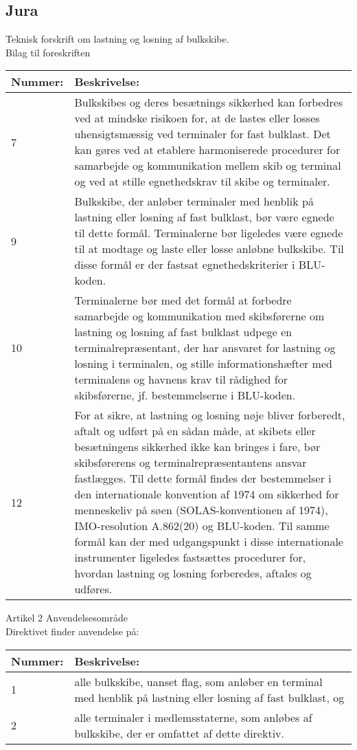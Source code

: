 \subsection{Jura}
Teknisk forskrift om lastning og losning af bulkskibe.\\
Bilag til foreskriften
\begin{table}[H]
\begin{tabular}{|p{1.5cm}|p{12cm}|} \hline
\cellcolor[gray]{0.85}Nummer: & \cellcolor[gray]{0.85}Beskrivelse:  \\ \hline
7 & Bulkskibes og deres besætnings sikkerhed kan forbedres ved at mindske risikoen for, at de lastes eller losses uhensigtsmæssig ved terminaler for fast bulklast. Det kan gøres ved at etablere harmoniserede procedurer for samarbejde og kommunikation mellem skib og terminal og ved at stille egnethedskrav til skibe og terminaler.   \\ \hline
9 & Bulkskibe, der anløber terminaler med henblik på lastning eller losning af fast bulklast, bør være egnede til dette formål. Terminalerne bør ligeledes være egnede til at modtage og laste eller losse anløbne bulkskibe. Til disse formål er der fastsat egnethedskriterier i BLU-koden. \\ \hline
10 & Terminalerne bør med det formål at forbedre samarbejde og kommunikation med skibsførerne om lastning og losning af fast bulklast udpege en terminalrepræsentant, der har ansvaret for lastning og losning i terminalen, og stille informationshæfter med terminalens og havnens krav til rådighed for skibsførerne, jf. bestemmelserne i BLU-koden. \\ \hline
12 &  For at sikre, at lastning og losning nøje bliver forberedt, aftalt og udført på en sådan måde, at skibets eller besætningens sikkerhed ikke kan bringes i fare, bør skibsførerens og terminalrepræsentantens ansvar fastlægges. Til dette formål findes der bestemmelser i den internationale konvention af 1974 om sikkerhed for menneskeliv på søen (SOLAS-konventionen af 1974), IMO-resolution A.862(20) og BLU-koden. Til samme formål kan der med udgangspunkt i disse internationale instrumenter ligeledes fastsættes procedurer for, hvordan lastning og losning forberedes, aftales og udføres.\\ \hline
\end{tabular}
\end{table}

Artikel 2 Anvendelsesområde\\
Direktivet finder anvendelse på:
\begin{table}[H]
\begin{tabular}{|p{1.5cm}|p{12cm}|} \hline
\cellcolor[gray]{0.85}Nummer: & \cellcolor[gray]{0.85}Beskrivelse:  \\ \hline
1 & alle bulkskibe, uanset flag, som anløber en terminal med henblik på lastning eller losning af fast bulklast, og   \\ \hline
2 & alle terminaler i medlemsstaterne, som anløbes af bulkskibe, der er omfattet af dette direktiv. \\ \hline
\end{tabular}
\end{table}

